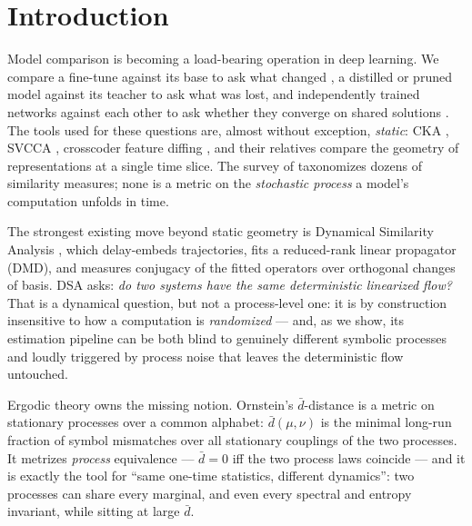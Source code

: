 \documentclass[11pt]{article}
\newcommand{\dbar}{\bar d}
\begin{document}
\section{Introduction}\label{sec:intro}

Model comparison is becoming a load-bearing operation in deep learning. We compare a
fine-tune against its base to ask what changed \citep{jiralerspong2026crossarch,
minder2025narrow}, a distilled or pruned model against its teacher to ask what was
lost, and independently trained networks against each other to ask whether they
converge on shared solutions \citep{huh2024platonic}. The tools used for these
questions are, almost without exception, \emph{static}: CKA
\citep{kornblith2019similarity}, SVCCA \citep{raghu2017svcca}, crosscoder feature
diffing \citep{jiralerspong2026crossarch}, and their relatives compare the geometry of
representations at a single time slice. The survey of \citet{klabunde2023similarity}
taxonomizes dozens of similarity measures; none is a metric on the \emph{stochastic
process} a model's computation unfolds in time.

The strongest existing move beyond static geometry is Dynamical Similarity Analysis
\citep[DSA;][]{ostrow2023beyond}, which delay-embeds trajectories, fits a reduced-rank
linear propagator (DMD), and measures conjugacy of the fitted operators over
orthogonal changes of basis. DSA asks: \emph{do two systems have the same
deterministic linearized flow?} That is a dynamical question, but not a process-level
one: it is by construction insensitive to how a computation is \emph{randomized} ---
and, as we show, its estimation pipeline can be both blind to genuinely different
symbolic processes and loudly triggered by process noise that leaves the deterministic
flow untouched.

Ergodic theory owns the missing notion. Ornstein's $\dbar$-distance
\citep{ornstein1970bernoulli, ornstein1974ergodic, gray1975generalization} is a metric
on stationary processes over a common alphabet: $\dbar(\mu,\nu)$ is the minimal
long-run fraction of symbol mismatches over all stationary couplings of the two
processes. It metrizes \emph{process} equivalence --- $\dbar = 0$ iff the two process
laws coincide --- and it is exactly the tool for ``same one-time statistics, different
dynamics'': two processes can share every marginal, and even every spectral and
entropy invariant, while sitting at large $\dbar$.
\end{document}
